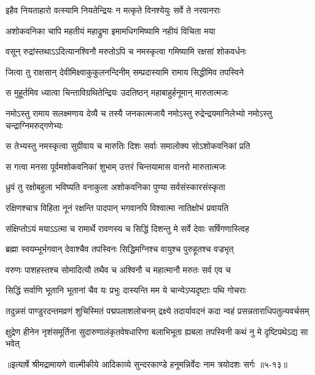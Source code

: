\twolineshloka
{इहैव नियताहारो वत्स्यामि नियतेन्द्रियः}
{न मत्कृते विनश्येयुः सर्वे ते नरवानराः} %

\twolineshloka
{अशोकवनिका चापि महतीयं महाद्रुमा}
{इमामधिगमिष्यामि नहीयं विचिता मया} %

\twolineshloka
{वसून् रुद्रांस्तथाऽऽदित्यानश्विनौ मरुतोऽपि च}
{नमस्कृत्वा गमिष्यामि रक्षसां शोकवर्धनः} %

\twolineshloka
{जित्वा तु राक्षसान् देवीमिक्ष्वाकुकुलनन्दिनीम्}
{सम्प्रदास्यामि रामाय सिद्धीमिव तपस्विने} %

\twolineshloka
{स मुहूर्तमिव ध्यात्वा चिन्ताविग्रथितेन्द्रियः}
{उदतिष्ठन् महाबाहुर्हनूमान् मारुतात्मजः} %

\twolineshloka
{नमोऽस्तु रामाय सलक्ष्मणाय देव्यै च तस्यै जनकात्मजायै}
{नमोऽस्तु रुद्रेन्द्रयमानिलेभ्यो नमोऽस्तु चन्द्राग्निमरुद्गणेभ्यः} %

\twolineshloka
{स तेभ्यस्तु नमस्कृत्वा सुग्रीवाय च मारुतिः}
{दिशः सर्वाः समालोक्य सोऽशोकवनिकां प्रति} %

\twolineshloka
{स गत्वा मनसा पूर्वमशोकवनिकां शुभाम्}
{उत्तरं चिन्तयामास वानरो मारुतात्मजः} %

\twolineshloka
{ध्रुवं तु रक्षोबहुला भविष्यति वनाकुला}
{अशोकवनिका पुण्या सर्वसंस्कारसंस्कृता} %

\twolineshloka
{रक्षिणश्चात्र विहिता नूनं रक्षन्ति पादपान्}
{भगवानपि विश्वात्मा नातिक्षोभं प्रवायति} %

\twolineshloka
{संक्षिप्तोऽयं मयाऽऽत्मा च रामार्थे रावणस्य च}
{सिद्धिं दिशन्तु मे सर्वे देवाः सर्षिगणास्त्विह} %

\twolineshloka
{ब्रह्मा स्वयम्भूर्भगवान् देवाश्चैव तपस्विनः}
{सिद्धिमग्निश्च वायुश्च पुरुहूतश्च वज्रभृत्} %

\twolineshloka
{वरुणः पाशहस्तश्च सोमादित्यौ तथैव च}
{अश्विनौ च महात्मानौ मरुतः सर्व एव च} %

\twolineshloka
{सिद्धिं सर्वाणि भूतानि भूतानां चैव यः प्रभुः}
{दास्यन्ति मम ये चान्येऽप्यदृष्टाः पथि गोचराः} %

\twolineshloka
{तदुन्नसं पाण्डुरदन्तमव्रणं शुचिस्मितं पद्मपलाशलोचनम्}
{द्रक्ष्ये तदार्यावदनं कदा न्वहं प्रसन्नताराधिपतुल्यवर्चसम्} %

\twolineshloka
{क्षुद्रेण हीनेन नृशंसमूर्तिना सुदारुणालंकृतवेषधारिणा}
{बलाभिभूता ह्यबला तपस्विनी कथं नु मे दृष्टिपथेऽद्य सा भवेत्} %


॥इत्यार्षे श्रीमद्रामायणे वाल्मीकीये आदिकाव्ये सुन्दरकाण्डे हनूमन्निर्वेदः नाम त्रयोदशः सर्गः ॥५-१३॥
